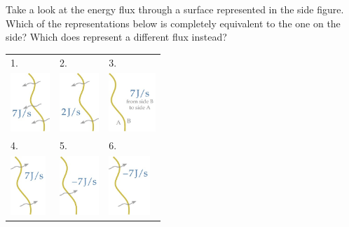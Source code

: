 \documentclass[a4paper,12pt,%
onecolumn,oneside,%
british%
]{memoir}
\renewcommand*{\|}[1][]{\nonscript\:#1\vert\nonscript\:\mathopen{}}
\begin{document}
%
Take a look at the energy flux through a surface represented in the side figure. Which of the representations below is completely equivalent to the one on the side? Which does represent a different flux instead?\noprelistbreak

\renewcommand{\tabularxcolumn}[1]{>{\bfseries}w{c}{0.3\linewidth}}
\begin{tabularx}{\linewidth}[h]{XXX}
1.&2.&3.
\\
  \includegraphics[align=c,height=6em]{images/Jflux_main1.jpg}
&  \includegraphics[align=c,height=6em]{images/Jflux_main2.jpg}
&  \includegraphics[align=c,height=6em]{images/Jflux_main3.jpg}
\\[10ex]
4.&5.&6.
\\
  \includegraphics[align=c, height=6em]{images/Jflux_main5.jpg}
&  \includegraphics[align=c, height=6em]{images/Jflux_main6.jpg}
&  \includegraphics[align=c, height=6em]{images/Jflux_main7.jpg}
\end{tabularx}
\end{document}
